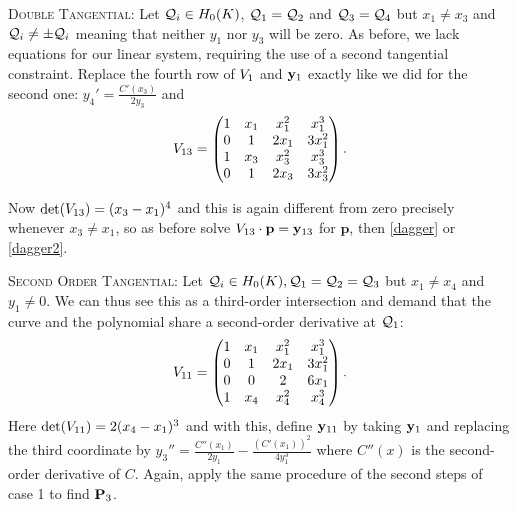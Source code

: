 \documentclass[english,11pt,a4paper]{article}
\begin{document}
\begin{case}
	{\scshape Double Tangential:} Let $\q_i \in \enk$, $\q_1 = \q_2$ and $\q_3 = \q_4$ but $x_1 \neq x_3$ and $\q_i \neq \pm \q_i$ meaning that neither $y_1$ nor $y_3$ will be zero. As before, we lack equations for our linear system, requiring the use of a second tangential constraint. Replace the fourth row of $\Vdoub$ and $\ydoub$ exactly like we did for the second one: $y_4'=\frac{C'(x_3)}{2 y_3}$ and
	\begin{align*}\Vddoub=
		\begin{pmatrix}
			1 & x_1 & x_1^2 & x_1^3\\
			0 & 1 & 2 x_1 & 3 x_1^2\\
			1 & x_3 & x_3^2 & x_3^3\\
			0 & 1 & 2 x_3 & 3 x_3^2\\
		\end{pmatrix}.
	\end{align*}

	Now $\det(\Vddoub)=(x_3-x_1)^4$ and this is again different from zero precisely whenever $x_3 \neq x_1$, so as before solve $\Vddoub \cdot \mathbf{p} = \yddoub$ for $\mathbf{p}$, then \eqref{dagger} or \eqref{dagger2}.
\end{case}

\begin{case}
	{\scshape Second Order Tangential:} Let $\q_i \in \enk , \q_1=\q_2=\q_3$ but $x_1 \neq x_4$ and $y_1 \neq 0$. We can thus see this as a third-order intersection and demand that the curve and the polynomial share a second-order derivative at $\q_1$:
	\begin{align*}\Vtri=
			\begin{pmatrix}
			1 & x_1 & x_1^2 & x_1^3\\
			0 & 1 & 2 x_1 & 3 x_1^2\\
			0 & 0 & 2 & 6x_1\\
			1 & x_4 & x_4^2 & x_4^3\\
		\end{pmatrix}.
	\end{align*}
	Here $\det(\Vtri)=2(x_4-x_1)^3$ and with this, define $\ytri$ by taking $\ydoub$ and replacing the third coordinate by $y_3'' = \frac{C''(x_1)}{2y_1}-\frac{(C'(x_1))^2}{4y_1^3}$ where $C''(x)$ is the second-order derivative of $C$. Again, apply the same procedure of the second steps of case 1 to find $\P_3$.

\end{case}
\end{document}
